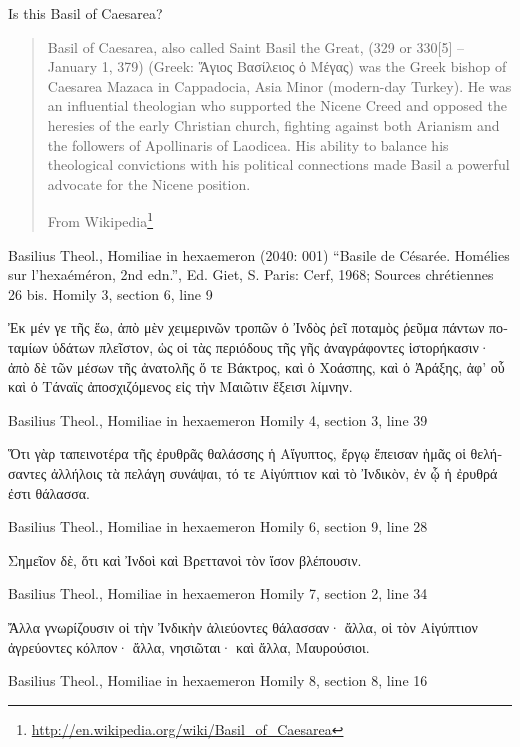 \documentclass[12pt,letterpaper,twoside,final]{memoir}
\begin{document}
Is this Basil of Caesarea?

\blockquote[From Wikipedia\footnote{\url{http://en.wikipedia.org/wiki/Basil_of_Caesarea}}]{Basil of Caesarea, also called Saint Basil the Great, (329 or 330[5] – January 1, 379) (Greek: Ἅγιος Βασίλειος ὁ Μέγας) was the Greek bishop of Caesarea Mazaca in Cappadocia, Asia Minor (modern-day Turkey). He was an influential theologian who supported the Nicene Creed and opposed the heresies of the early Christian church, fighting against both Arianism and the followers of Apollinaris of Laodicea. His ability to balance his theological convictions with his political connections made Basil a powerful advocate for the Nicene position.}

\begin{greek}

Basilius Theol., Homiliae in hexaemeron (2040: 001)
“Basile de Césarée. Homélies sur l'hexaéméron, 2nd edn.”, Ed. Giet, S.
Paris: Cerf, 1968; Sources chrétiennes 26 bis.
Homily 3, section 6, line 9

                 Ἐκ μέν γε τῆς ἕω, ἀπὸ μὲν χειμερινῶν 
τροπῶν ὁ Ἰνδὸς ῥεῖ ποταμὸς ῥεῦμα πάντων ποταμίων 
ὑδάτων πλεῖστον, ὡς οἱ τὰς περιόδους τῆς γῆς ἀναγράφοντες 
ἱστορήκασιν· ἀπὸ δὲ τῶν μέσων τῆς ἀνατολῆς ὅ τε Βάκτρος, 
καὶ ὁ Χοάσπης, καὶ ὁ Ἀράξης, ἀφ' οὗ καὶ ὁ Τάναϊς 
ἀποσχιζόμενος εἰς τὴν Μαιῶτιν ἔξεισι λίμνην. 



Basilius Theol., Homiliae in hexaemeron 
Homily 4, section 3, line 39

                 Ὅτι γὰρ ταπεινοτέρα τῆς ἐρυθρᾶς θαλάσσης 
ἡ Αἴγυπτος, ἔργῳ ἔπεισαν ἡμᾶς οἱ θελήσαντες ἀλλήλοις τὰ 
πελάγη συνάψαι, τό τε Αἰγύπτιον καὶ τὸ Ἰνδικὸν, ἐν ᾧ ἡ 
ἐρυθρά ἐστι θάλασσα. 



Basilius Theol., Homiliae in hexaemeron 
Homily 6, section 9, line 28

                             Σημεῖον δὲ, ὅτι καὶ Ἰνδοὶ καὶ 
Βρεττανοὶ τὸν ἴσον βλέπουσιν. 



Basilius Theol., Homiliae in hexaemeron 
Homily 7, section 2, line 34

                                   Ἄλλα γνωρίζουσιν οἱ τὴν 
Ἰνδικὴν ἁλιεύοντες θάλασσαν· ἄλλα, οἱ τὸν Αἰγύπτιον 
ἀγρεύοντες κόλπον· ἄλλα, νησιῶται· καὶ ἄλλα, Μαυρούσιοι. 



Basilius Theol., Homiliae in hexaemeron 
Homily 8, section 8, line 16


\end{greek}
\end{document}
